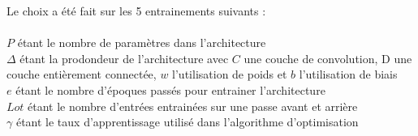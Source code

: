 \begin{multicols}{2}
Le choix a été fait sur les 5 entrainements suivants : \\

 \\

{\scriptsize
$P$ étant le nombre de paramètres dans l'architecture\\

$\Delta$ étant la prodondeur de l'architecture avec $C$ une couche de convolution, D une couche entièrement connectée, $w$ l'utilisation de poids et $b$ l'utilisation de biais \\

$e$ étant le nombre d'époques passés pour entrainer l'architecture \\

$Lot$ étant le nombre d'entrées entrainées sur une passe avant et arrière \\

$\gamma$ étant le taux d'apprentissage utilisé dans l'algorithme d'optimisation \\

}
\end{multicols}
